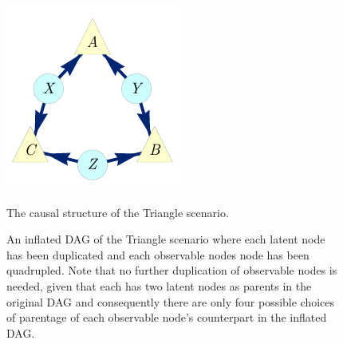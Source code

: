 \begin{figure}[h]
\centering
\begin{minipage}[t]{0.23\linewidth}
\centering
\includegraphics[scale=1]{TriDagRawALT.pdf}
\caption{The causal structure of the Triangle scenario.}\label{fig:TriMainDAG}
\end{minipage}
\hfill
\begin{minipage}[t]{0.43\linewidth}
\centering
{}
\caption{An inflated DAG of the Triangle scenario where each latent node has been duplicated and each observable nodes node has been quadrupled.  Note that no further duplication of observable nodes is needed, given that each has two latent nodes as parents in the original DAG and consequently there are only four possible choices of parentage of each observable node's counterpart in the inflated DAG. }\label{fig:TriFullDouble}

\end{minipage}
\end{figure}
